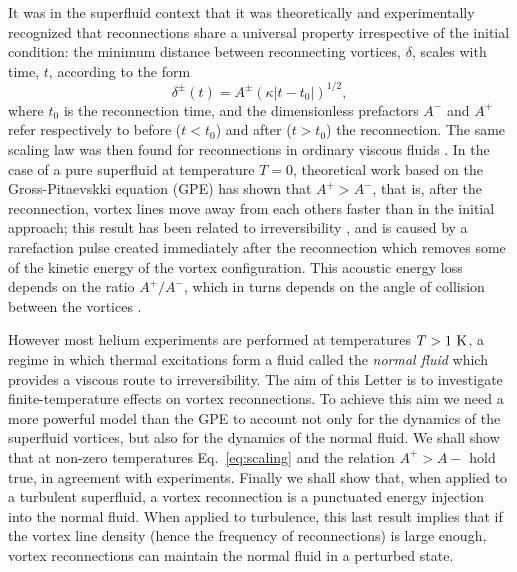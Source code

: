 \documentclass[%
 reprint,
 amsmath,amssymb,
 aps,
 prl,
]{revtex4-2}
\begin{document}
It was in the superfluid context that it was theoretically and
experimentally recognized
\cite{nazarenko2003,bewley2008,paoletti2010,zuccherQuantumVortexReconnections2012a,villoisUniversalNonuniversalAspects2017a,galantucciCrossoverInteractionDriven2019a}
that reconnections share a universal property irrespective of the initial
condition: the minimum distance between reconnecting 
vortices, $\delta$, scales with time, $t$, according to the form
\begin{equation}
\label{eq:scaling}
	\delta^{\pm}(t) = A^{\pm} (\kappa|t-t_0|)^{1/2},
\end{equation} 
\noindent
where $t_0$ is the reconnection time, and the dimensionless
prefactors $A^-$ and $A^+$ refer respectively to before
($t<t_0$) and after ($t>t_0$) the reconnection. The same scaling law
was then found for reconnections in ordinary viscous fluids 
\cite{yaoSeparationScalingViscous2020}. In the case of a pure
superfluid at temperature $T=0$, theoretical work based on
the Gross-Pitaevskki equation (GPE) has shown that
$A^+>A^-$, that is, after the reconnection, vortex lines move away from 
each others faster than in the initial approach; this result has been
related to irreversibility \cite{villoisIrreversibleDynamicsVortex2020},
and is caused by a rarefaction pulse created immediately after the reconnection\cite{leadbeaterSoundEmissionDue2001b,zuccherQuantumVortexReconnections2012a} which
removes some of the kinetic energy of the vortex configuration.
This acoustic energy loss depends on
the ratio $A^+/A^-$, which in turns depends on the angle of collision
between the vortices \cite{villoisIrreversibleDynamicsVortex2020}. 

However most helium experiments
are performed at temperatures $T>1~\rm K$, a regime in which thermal 
excitations form a fluid called the {\it normal fluid} which provides a viscous
route to irreversibility. The aim of this Letter is to investigate
finite-temperature effects on vortex reconnections. 
To achieve this aim we need a more powerful
model than the GPE to account not only for the dynamics of the
superfluid vortices, but also for the dynamics of the normal fluid.
We shall show that at non-zero temperatures Eq.~\ref{eq:scaling} and the
relation $A^+>A-$ hold true, in agreement with experiments. Finally we shall
show that, when applied to a turbulent superfluid, a vortex
reconnection is a punctuated energy injection into the normal fluid.
When applied to turbulence, this last result implies that if the vortex line density (hence the frequency of reconnections) is large enough, vortex
reconnections can maintain the normal fluid in a perturbed state.
\end{document}
